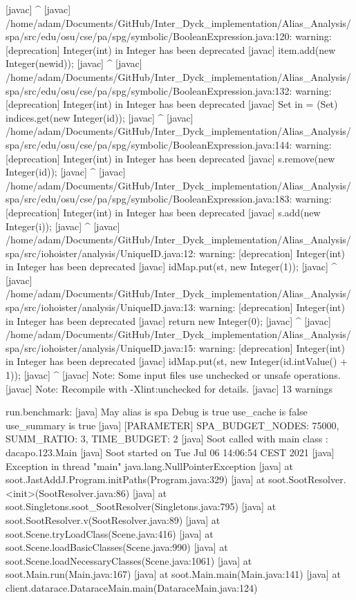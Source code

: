     [javac] 			            ^
    [javac] /home/adam/Documents/GitHub/Inter_Dyck_implementation/Alias_Analysis/spa/src/edu/osu/cse/pa/spg/symbolic/BooleanExpression.java:120: warning: [deprecation] Integer(int) in Integer has been deprecated
    [javac] 			item.add(new Integer(newid));
    [javac] 			         ^
    [javac] /home/adam/Documents/GitHub/Inter_Dyck_implementation/Alias_Analysis/spa/src/edu/osu/cse/pa/spg/symbolic/BooleanExpression.java:132: warning: [deprecation] Integer(int) in Integer has been deprecated
    [javac] 		Set in = (Set) indices.get(new Integer(id));
    [javac] 		                           ^
    [javac] /home/adam/Documents/GitHub/Inter_Dyck_implementation/Alias_Analysis/spa/src/edu/osu/cse/pa/spg/symbolic/BooleanExpression.java:144: warning: [deprecation] Integer(int) in Integer has been deprecated
    [javac] 					s.remove(new Integer(id));
    [javac] 					         ^
    [javac] /home/adam/Documents/GitHub/Inter_Dyck_implementation/Alias_Analysis/spa/src/edu/osu/cse/pa/spg/symbolic/BooleanExpression.java:183: warning: [deprecation] Integer(int) in Integer has been deprecated
    [javac] 				s.add(new Integer(i));
    [javac] 				      ^
    [javac] /home/adam/Documents/GitHub/Inter_Dyck_implementation/Alias_Analysis/spa/src/iohoister/analysis/UniqueID.java:12: warning: [deprecation] Integer(int) in Integer has been deprecated
    [javac] 			idMap.put(st, new Integer(1));
    [javac] 			              ^
    [javac] /home/adam/Documents/GitHub/Inter_Dyck_implementation/Alias_Analysis/spa/src/iohoister/analysis/UniqueID.java:13: warning: [deprecation] Integer(int) in Integer has been deprecated
    [javac] 			return new Integer(0);
    [javac] 			       ^
    [javac] /home/adam/Documents/GitHub/Inter_Dyck_implementation/Alias_Analysis/spa/src/iohoister/analysis/UniqueID.java:15: warning: [deprecation] Integer(int) in Integer has been deprecated
    [javac] 			idMap.put(st, new Integer(id.intValue() + 1));
    [javac] 			              ^
    [javac] Note: Some input files use unchecked or unsafe operations.
    [javac] Note: Recompile with -Xlint:unchecked for details.
    [javac] 13 warnings

run.benchmark:
     [java] May alias is spa   Debug is true   use_cache is false  use_summary is true
     [java] [PARAMETER] SPA_BUDGET_NODES: 75000, SUMM_RATIO: 3, TIME_BUDGET: 2
     [java] Soot called with main class : dacapo.123.Main
     [java] Soot started on Tue Jul 06 14:06:54 CEST 2021
     [java] Exception in thread "main" java.lang.NullPointerException
     [java] 	at soot.JastAddJ.Program.initPaths(Program.java:329)
     [java] 	at soot.SootResolver.<init>(SootResolver.java:86)
     [java] 	at soot.Singletons.soot_SootResolver(Singletons.java:795)
     [java] 	at soot.SootResolver.v(SootResolver.java:89)
     [java] 	at soot.Scene.tryLoadClass(Scene.java:416)
     [java] 	at soot.Scene.loadBasicClasses(Scene.java:990)
     [java] 	at soot.Scene.loadNecessaryClasses(Scene.java:1061)
     [java] 	at soot.Main.run(Main.java:167)
     [java] 	at soot.Main.main(Main.java:141)
     [java] 	at client.datarace.DataraceMain.main(DataraceMain.java:124)

